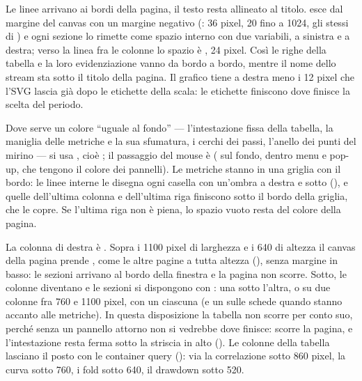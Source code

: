 Le linee arrivano ai bordi della pagina, il testo resta allineato al titolo.
 esce dal margine del canvas con un margine negativo
(: 36 pixel, 20 fino a \num{1024}, gli stessi di
) e ogni sezione lo rimette come spazio interno con
due variabili,  a sinistra e  a destra; verso la
linea fra le colonne lo spazio è , 24 pixel. Così le righe della
tabella e la loro evidenziazione vanno da bordo a bordo, mentre il nome dello
stream sta sotto il titolo della pagina. Il grafico tiene a destra
 meno i 12 pixel che l'SVG lascia già dopo le etichette della
scala: le etichette finiscono dove finisce la scelta del periodo.

Dove serve un colore \enquote{uguale al fondo} --- l'intestazione fissa della
tabella, la maniglia delle metriche e la sua sfumatura, i cerchi dei passi,
l'anello dei punti del mirino --- si usa , cioè
; il passaggio del mouse è 
( sul fondo,  dentro menu e pop-up, che
tengono il colore dei pannelli). Le metriche stanno in una griglia con il
bordo: le linee interne le disegna ogni casella con un'ombra a destra e sotto
(), e quelle dell'ultima colonna e dell'ultima riga finiscono
sotto il bordo della griglia, che le copre. Se l'ultima riga non è piena, lo
spazio vuoto resta del colore della pagina.

La colonna di destra è . Sopra i \num{1100}
pixel di larghezza e i \num{640} di altezza il canvas della pagina prende
, come le altre pagine a tutta altezza
(), senza margine in basso: le sezioni arrivano al bordo
della finestra e la pagina non scorre. Sotto, le colonne diventano
 e le sezioni si dispongono con
: una sotto l'altra, o su due colonne fra \num{760} e
\num{1100} pixel, con un  ciascuna (e un  sulle
schede quando stanno accanto alle metriche). In questa disposizione la tabella
non scorre per conto suo, perché senza un pannello attorno non si vedrebbe
dove finisce: scorre la pagina, e l'intestazione resta ferma sotto la striscia
in alto (). Le colonne della tabella lasciano il
posto con le container query (): via la
correlazione sotto \num{860} pixel, la curva sotto \num{760}, i fold sotto
\num{640}, il drawdown sotto \num{520}.

